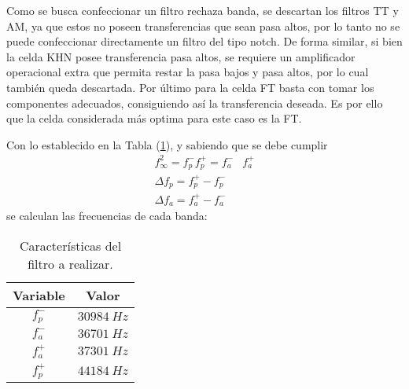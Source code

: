 Como se busca confeccionar un filtro rechaza banda, se descartan los filtros TT y AM, ya que estos no poseen transferencias que sean pasa altos, por lo tanto no se puede confeccionar directamente un filtro del tipo notch. De forma similar, si bien la celda KHN posee transferencia pasa altos, se requiere un amplificador operacional extra que permita restar la pasa bajos y pasa altos, por lo cual también queda descartada. Por último para la celda FT basta con tomar los componentes adecuados, consiguiendo así la transferencia deseada. Es por ello que la celda considerada más optima para este caso es la FT.

Con lo establecido en la Tabla (\ref{tabla:caracteristicas}), y sabiendo que se debe cumplir
\begin{equation}
\begin{split}
	f_{\infty}^{2} = f_{p}^{-} f_{p}^{+} = f_{a}^{-} & f_{a}^{+} \\
	\Delta f_p = f_{p}^{+} - f_{p}^{-} \\
	\Delta f_a = f_{a}^{+} - f_{a}^{-} 
\end{split}
\end{equation}
se calculan las frecuencias de cada banda:
\begin{table}[H]
\centering
\begin{tabular}{cc}
\hline
\textbf{Variable} & \textbf{Valor} \\
\hline
$f_{p}^{-}$ & $30984 \ Hz$ \\
$f_{a}^{-}$ & $36701 \ Hz$ \\
$f_{a}^{+}$ & $37301 \ Hz$ \\
$f_{p}^{+}$ & $44184\ Hz$ \\
\hline
\end{tabular}
\caption{Características del filtro a realizar.}
\label{tabla:caracteristicas}
\end{table}


